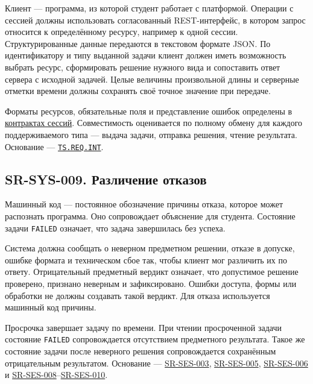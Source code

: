 \documentclass[12pt,a4paper]{article}
\begin{document}
\hypertarget{sr-sys-008-совместимость-обмена}{}

\hypertarget{sr-sys-008}{}

Клиент --- программа, из которой студент работает с платформой. Операции с сессией должны использовать согласованный REST-интерфейс, в котором запрос относится к определённому ресурсу, например к одной сессии. Структурированные данные передаются в текстовом формате JSON. По идентификатору и типу выданной задачи клиент должен иметь возможность выбрать ресурс, сформировать решение нужного вида и сопоставить ответ сервера с исходной задачей. Целые величины произвольной длины и серверные отметки времени должны сохранять своё точное значение при передаче.

Форматы ресурсов, обязательные поля и представление ошибок определены в {\href{../07\_Программные\_требования/DOC-06.2\_Сессии\_задач\_и\_планировщик.pdf\#doc-062-контракты-сессий-задач}{контрактах сессий}}. Совместимость оценивается по полному обмену для каждого поддерживаемого типа --- выдача задачи, отправка решения, чтение результата. Основание --- {\href{../02\_Техническое\_задание/DOC-02\_Техническое\_задание.pdf\#ts-req-int}{\texttt{TS.REQ.INT}}}.

\subsection{SR-SYS-009. Различение отказов}\label{sr-sys-009-ux440ux430ux437ux43bux438ux447ux435ux43dux438ux435-ux43eux442ux43aux430ux437ux43eux432}

\hypertarget{sr-sys-009-различение-отказов}{}

\hypertarget{sr-sys-009}{}

Машинный код --- постоянное обозначение причины отказа, которое может распознать программа. Оно сопровождает объяснение для студента. Состояние задачи \texttt{FAILED} означает, что задача завершилась без успеха.

Система должна сообщать о неверном предметном решении, отказе в допуске, ошибке формата и техническом сбое так, чтобы клиент мог различить их по ответу. Отрицательный предметный вердикт означает, что допустимое решение проверено, признано неверным и зафиксировано. Ошибки доступа, формы или обработки не должны создавать такой вердикт. Для отказа используется машинный код причины.

Просрочка завершает задачу по времени. При чтении просроченной задачи состояние \texttt{FAILED} сопровождается отсутствием предметного результата. Такое же состояние задачи после неверного решения сопровождается сохранённым отрицательным результатом. Основание --- {\hyperlink{sr-ses-003}{SR-SES-003}}, {\hyperlink{sr-ses-005}{SR-SES-005}}, {\hyperlink{sr-ses-006}{SR-SES-006}} и {\hyperlink{sr-ses-008}{SR-SES-008}}--{\hyperlink{sr-ses-010}{SR-SES-010}}.
\end{document}
